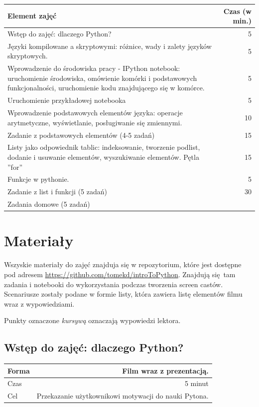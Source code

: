 \documentclass{mwart}
\begin{document}
\begin{center}
  \begin{tabular}{p{10cm}r}
  \toprule
  \textbf{Element zajęć}  & \textbf{Czas (w min.)}   \\
  \midrule
  Wstęp do zajęć: dlaczego Python? & 5 \\
  \midrule
  Języki kompilowane  a skryptowymi: różnice, wady i zalety języków skryptowych. & 5 \\
  \midrule
  Wprowadzenie do środowiska pracy - IPython notebook: uruchomienie środowiska, omówienie
  komórki i podstawowych funkcjonalności, uruchomienie kodu znajdującego się w komórce.
  & 5 \\
  \midrule
  Uruchomienie przykładowej notebooka & 5 \\
  \midrule
  Wprowadzenie podstawowych elementów języka: operacje arytmetyczne, wyświetlanie,
  posługiwanie się zmiennymi. & 10 \\
  \midrule
  Zadanie z podstawowych elementów (4-5 zadań) & 15 \\
  \midrule
  Listy jako odpowiednik tablic: indeksowanie, tworzenie podlist, dodanie i usuwanie
  elementów, wyszukiwanie elementów. Pętla ''for'' & 15 \\
  \midrule
  Funkcje w pythonie. & 5 \\
  \midrule
  Zadanie z list i funkcji (5 zadań) & 30 \\
  \midrule
  Zadania domowe (5 zadań) & \\
  \bottomrule
\end{tabular}
\end{center}

\section{Materiały}
Wszyskie materiały do zajęć znajduja się w repozytorium, które jest dostępne pod adresem
\href{https://github.com/tomekd/introToPython}{https://github.com/tomekd/introToPython}.
Znajdują się tam zadania i  notebooki do wykorzystania podczas tworzenia screen
castów.
Scenariusze zostały podane w formie listy, która zawiera listę elementów
filmu wraz z wypowiedziami.

Punkty oznaczone \emph{kursywą} oznaczają wypowiedzi lektora.


\subsection{Wstęp do zajęć: dlaczego Python?}
\begin{center}
  \begin{tabular}{lr}
    \toprule
    Forma & Film wraz z prezentacją.\\
    \midrule
    Czas & 5 minut \\
    Cel &  Przekazanie użytkownikowi motywacji do nauki Pytona. \\
    \bottomrule
  \end{tabular}
\end{center}
\end{document}
